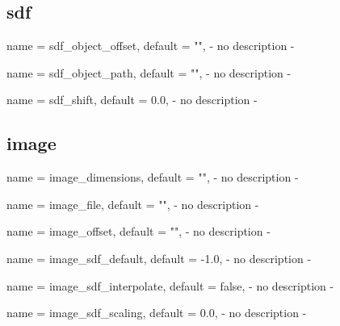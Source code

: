 \subsection{sdf}

\begin{parameter}{
    name    = {sdf_object_offset},
    default = {""},
}
- no description -
\end{parameter}

\begin{parameter}{
    name    = {sdf_object_path},
    default = {""},
}
- no description -
\end{parameter}

\begin{parameter}{
    name    = {sdf_shift},
    default = {0.0},
}
- no description -
\end{parameter}

\subsection{image}

\begin{parameter}{
    name    = {image_dimensions},
    default = {""},
}
- no description -
\end{parameter}

\begin{parameter}{
    name    = {image_file},
    default = {""},
}
- no description -
\end{parameter}

\begin{parameter}{
    name    = {image_offset},
    default = {""},
}
- no description -
\end{parameter}

\begin{parameter}{
    name    = {image_sdf_default},
    default = {-1.0},
}
- no description -
\end{parameter}

\begin{parameter}{
    name    = {image_sdf_interpolate},
    default = {false},
}
- no description -
\end{parameter}

\begin{parameter}{
    name    = {image_sdf_scaling},
    default = {0.0},
}
- no description -
\end{parameter}

